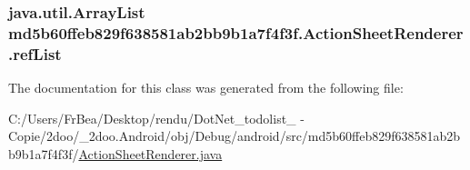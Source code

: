 \hypertarget{classmd5b60ffeb829f638581ab2bb9b1a7f4f3f_1_1_action_sheet_renderer_78f781206c2fbe428d26569e6da13553}{
\subsubsection[{refList}]{\setlength{\rightskip}{0pt plus 5cm}java.util.ArrayList {\bf md5b60ffeb829f638581ab2bb9b1a7f4f3f.ActionSheetRenderer.refList}}}
\label{classmd5b60ffeb829f638581ab2bb9b1a7f4f3f_1_1_action_sheet_renderer_78f781206c2fbe428d26569e6da13553}




The documentation for this class was generated from the following file:\begin{CompactItemize}
\item 
C:/Users/FrBea/Desktop/rendu/DotNet\_\-todolist\_ - Copie/2doo/\_\-2doo.Android/obj/Debug/android/src/md5b60ffeb829f638581ab2bb9b1a7f4f3f/\hyperlink{_action_sheet_renderer_8java}{ActionSheetRenderer.java}\end{CompactItemize}
